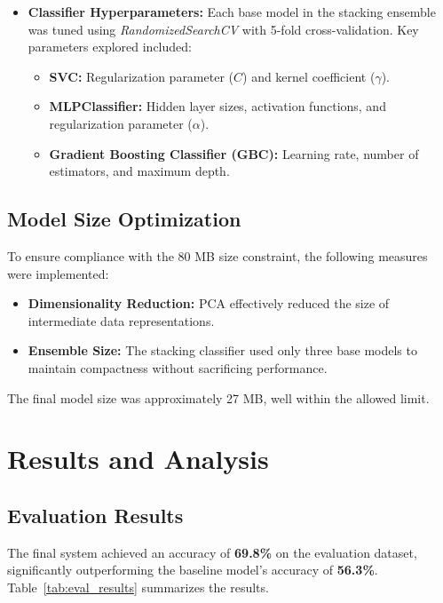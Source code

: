 \documentclass[a4paper]{article}
\begin{document}
\begin{itemize}
    \item \textbf{Classifier Hyperparameters:} Each base model in the stacking ensemble was tuned using \textit{RandomizedSearchCV} with 5-fold cross-validation. Key parameters explored included:
    \begin{itemize}
        \item \textbf{SVC:} Regularization parameter (\(C\)) and kernel coefficient (\(\gamma\)).
        \item \textbf{MLPClassifier:} Hidden layer sizes, activation functions, and regularization parameter (\(\alpha\)).
        \item \textbf{Gradient Boosting Classifier (GBC):} Learning rate, number of estimators, and maximum depth.
    \end{itemize}
\end{itemize}

\subsection{Model Size Optimization}
To ensure compliance with the 80 MB size constraint, the following measures were implemented:
\begin{itemize}
    \item \textbf{Dimensionality Reduction:} PCA effectively reduced the size of intermediate data representations.
    \item \textbf{Ensemble Size:} The stacking classifier used only three base models to maintain compactness without sacrificing performance.
\end{itemize}
The final model size was approximately 27 MB, well within the allowed limit.


\section{Results and Analysis}

%

\subsection{Evaluation Results}
The final system achieved an accuracy of \textbf{69.8\%} on the evaluation dataset, significantly outperforming the baseline model's accuracy of \textbf{56.3\%}. Table~\ref{tab:eval_results} summarizes the results.
\end{document}
